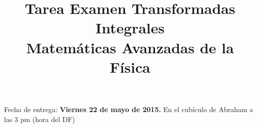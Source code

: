 
\usepackage{enumerate}
\usepackage{pifont}
\renewcommand{\labelitemi}{\ding{43}}
\title{{Tarea Examen Transformadas Integrales} \\ {\large Matemáticas Avanzadas de la Física}}
\date{ }

\renewcommand\labelenumii{\theenumi.{\arabic{enumii}})}
\maketitle
\fontsize{14}{14}\selectfont
Fecha de entrega: \textbf{Viernes 22 de mayo de 2015.} En el cubículo de Abraham a las 3 pm (hora del DF)
\\
\begin{enumerate}


\end{enumerate}
